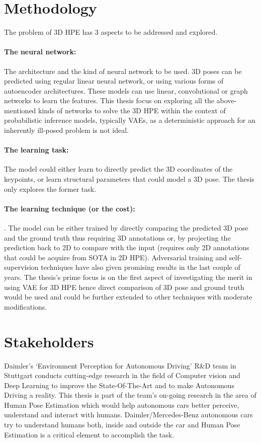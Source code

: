 \section{Methodology}

The problem of 3D \ac{HPE} has 3 aspects to be addressed and explored. 

\paragraph{The neural network:} The architecture and the kind of neural network to be used. 3D poses can be predicted using regular linear neural network, or using various forms of autoencoder architectures. These models can use linear, convolutional or graph networks to learn the features. This thesis focus on exploring all the above-mentioned kinds of networks to solve the 3D \ac{HPE} within the context of probabilistic inference models, typically \ac{VAE}s, as a deterministic approach for an inherently ill-posed problem is not ideal. 

\paragraph{The learning task:} The model could either learn to directly predict the 3D coordinates of the keypoints, or learn structural parameters that could model a 3D pose. The thesis only explores the former task.

\paragraph{The learning technique (or the cost):}. The model can be either trained by directly comparing the predicted 3D pose and the ground truth thus requiring 3D annotations or, by projecting the prediction back to 2D to compare with the input (requires only 2D annotations that could be acquire from \ac{SOTA} in 2D \ac{HPE}). Adversarial training and self-supervision techniques have also given promising results in the last couple of years. The thesis's prime focus is on the first aspect of investigating the merit in using \ac{VAE} for 3D \ac{HPE} hence direct comparison of 3D pose and ground truth would be used and could be further extended to other techniques with moderate modifications.


\section{Stakeholders}
Daimler’s ‘Environment Perception for Autonomous Driving’ R\&D team in Stuttgart conducts cutting-edge research in the field of Computer vision and Deep Learning to improve the State-Of-The-Art and to make Autonomous Driving a reality. This thesis is part of the team’s on-going research in the area of Human Pose Estimation which would help autonomous cars better perceive, understand and interact with humans. Daimler/Mercedes-Benz autonomous cars try to understand humans both, inside and outside the car and Human Pose Estimation is a critical element to accomplish the task.

